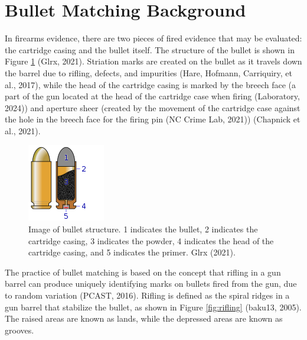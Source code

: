 \documentclass[print]{nuthesis}
\begin{document}
\hypertarget{bullet-matching-background}{%
\section{Bullet Matching Background}\label{bullet-matching-background}}

In firearms evidence, there are two pieces of fired evidence that may be evaluated: the cartridge casing and the bullet itself.
The structure of the bullet is shown in Figure \ref{fig:structure} (Glrx, 2021).
Striation marks are created on the bullet as it travels down the barrel due to rifling, defects, and impurities (Hare, Hofmann, Carriquiry, et al., 2017), while the head of the cartridge casing is marked by the breech face (a part of the gun located at the head of the cartridge case when firing (Laboratory, 2024)) and aperture sheer (created by the movement of the cartridge case against the hole in the breech face for the firing pin (NC Crime Lab, 2021)) (Chapnick et al., 2021).

\begin{figure}

{\centering \includegraphics[width=0.5\linewidth]{images/Cartridge_cross_section} 

}

\caption{Image of bullet structure. 1 indicates the bullet, 2 indicates the cartridge casing, 3 indicates the powder, 4 indicates the head of the cartridge casing, and 5 indicates the primer. Glrx (2021).}\label{fig:structure}
\end{figure}

The practice of bullet matching is based on the concept that rifling in a gun barrel can produce uniquely identifying marks on bullets fired from the gun, due to random variation (PCAST, 2016).
Rifling is defined as the spiral ridges in a gun barrel that stabilize the bullet, as shown in Figure \ref{fig:rifling} (baku13, 2005).
The raised areas are known as lands, while the depressed areas are known as grooves.
\end{document}
